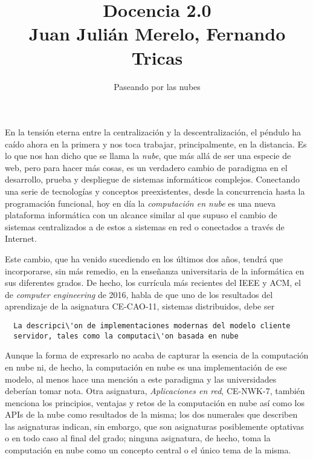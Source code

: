 \documentclass[twoside,10pt]{article}
\title{Docencia 2.0\\ \large Juan Juli\'an Merelo, Fernando 
Tricas}
\author{\LARGE Paseando por las nubes}
\date{}
\newcounter{num}
\begin{document}
\addtocounter{page}{2}

\maketitle
\vspace*{-8ex}

\begin{multicols}{2}

  En la tensión eterna entre la centralización y la descentralización,
  el péndulo ha caído ahora en la primera y nos toca trabajar,
  principalmente, en la distancia. Es lo que nos han dicho que se
  llama la {\em nube}, que m\'as all\'a de ser una especie de web, pero para hacer
  m\'as cosas, es un verdadero cambio de paradigma en el desarrollo,
  prueba y despliegue de sistemas inform\'aticos complejos. Conectando
  una serie de tecnolog\'ias y conceptos preexistentes, desde la
  concurrencia hasta la programaci\'on funcional, hoy en d\'ia la {\em
    computaci\'on en nube} es una nueva plataforma inform\'atica con un
  alcance similar al que supuso el cambio de sistemas centralizados a
  de estos a sistemas en red o conectados a trav\'es de Internet.

%


Este cambio, que ha venido sucediendo en los \'ultimos dos a\~nos, tendr\'a
que incorporarse, sin m\'as remedio, en la ense\~nanza universitaria de la
inform\'atica en sus diferentes grados. De hecho, los curr\'icula m\'as
recientes del IEEE y ACM, el de {\em computer engineering} de 2016, habla de
que uno de los resultados del aprendizaje de la asignatura CE-CAO-11,
sistemas distribuidos, debe ser
\begin{verbatim}
  La descripci\'on de implementaciones modernas del modelo cliente
  servidor, tales como la computaci\'on basada en nube
  \end{verbatim}
Aunque la forma de expresarlo no acaba de capturar la esencia de la
computaci\'on en nube ni, de hecho, la computaci\'on en nube es una
implementaci\'on de ese modelo, al menos hace una menci\'on a este
paradigma y las universidades deber\'ian tomar nota. Otra asignatura,
{\em Aplicaciones en red}, CE-NWK-7, tambi\'en menciona los principios,
ventajas y retos de la computaci\'on en nube as\'i como los APIs de la
nube como resultados de la misma; los dos numerales que describen las
asignaturas indican, sin embargo, que son asignaturas posiblemente
optativas o en todo caso al final del grado; ninguna asignatura, de
hecho, toma la computaci\'on en nube como un concepto central o el \'unico
tema de la misma. 


\end{multicols}
\end{document}
